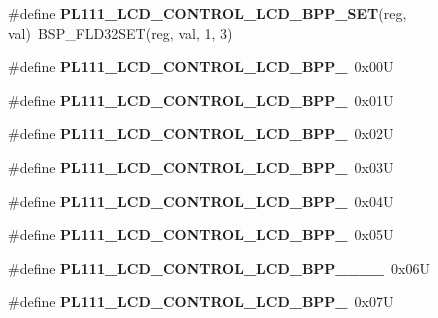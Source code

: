 \begin{DoxyCompactItemize}
\mbox{\label{arm-pl111-regs_8h_a271b640af12899cf780585254b9214e0}} 
\#define {\bfseries P\+L111\+\_\+\+L\+C\+D\+\_\+\+C\+O\+N\+T\+R\+O\+L\+\_\+\+L\+C\+D\+\_\+\+B\+P\+P\+\_\+\+S\+ET}(reg,  val)~B\+S\+P\+\_\+\+F\+L\+D32\+S\+ET(reg, val, 1, 3)
\item 
\mbox{\label{arm-pl111-regs_8h_a9dd872a5a2fc09b16308f7fac541fe74}} 
\#define {\bfseries P\+L111\+\_\+\+L\+C\+D\+\_\+\+C\+O\+N\+T\+R\+O\+L\+\_\+\+L\+C\+D\+\_\+\+B\+P\+P\+\_}~0x00U
\item 
\mbox{\label{arm-pl111-regs_8h_a374770493390b21713467903b0a96191}} 
\#define {\bfseries P\+L111\+\_\+\+L\+C\+D\+\_\+\+C\+O\+N\+T\+R\+O\+L\+\_\+\+L\+C\+D\+\_\+\+B\+P\+P\+\_}~0x01U
\item 
\mbox{\label{arm-pl111-regs_8h_a14ab14f37ab46576c2517f0f44ddd973}} 
\#define {\bfseries P\+L111\+\_\+\+L\+C\+D\+\_\+\+C\+O\+N\+T\+R\+O\+L\+\_\+\+L\+C\+D\+\_\+\+B\+P\+P\+\_}~0x02U
\item 
\mbox{\label{arm-pl111-regs_8h_acde96e43cb5d08033c04cd96c453b888}} 
\#define {\bfseries P\+L111\+\_\+\+L\+C\+D\+\_\+\+C\+O\+N\+T\+R\+O\+L\+\_\+\+L\+C\+D\+\_\+\+B\+P\+P\+\_}~0x03U
\item 
\mbox{\label{arm-pl111-regs_8h_a7368b8d8a81d6fc978624313a0c46f94}} 
\#define {\bfseries P\+L111\+\_\+\+L\+C\+D\+\_\+\+C\+O\+N\+T\+R\+O\+L\+\_\+\+L\+C\+D\+\_\+\+B\+P\+P\+\_}~0x04U
\item 
\mbox{\label{arm-pl111-regs_8h_af9374947eaffce7fc8a7883a80141fd7}} 
\#define {\bfseries P\+L111\+\_\+\+L\+C\+D\+\_\+\+C\+O\+N\+T\+R\+O\+L\+\_\+\+L\+C\+D\+\_\+\+B\+P\+P\+\_}~0x05U
\item 
\mbox{\label{arm-pl111-regs_8h_abb221a91b56cb3561b0f65b81d0b52b7}} 
\#define {\bfseries P\+L111\+\_\+\+L\+C\+D\+\_\+\+C\+O\+N\+T\+R\+O\+L\+\_\+\+L\+C\+D\+\_\+\+B\+P\+P\+\_\+\_\+\_\+\_}~0x06U
\item 
\mbox{\label{arm-pl111-regs_8h_a940a78c45394919d19ccdefcfbb5ddcc}} 
\#define {\bfseries P\+L111\+\_\+\+L\+C\+D\+\_\+\+C\+O\+N\+T\+R\+O\+L\+\_\+\+L\+C\+D\+\_\+\+B\+P\+P\+\_}~0x07U

\end{DoxyCompactItemize}
